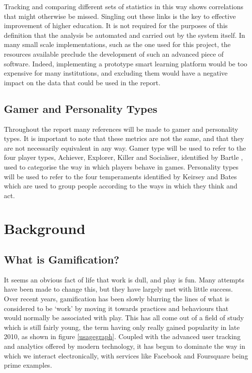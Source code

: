 \documentclass[12pt,a4paper,twoside]{report}
\begin{document}
Tracking and comparing different sets of statistics in this way shows correlations that might otherwise be missed. Singling out these links is the key to effective improvement of higher education. It is not required for the purposes of this definition that the analysis be automated and carried out by the system itself. In many small scale implementations, such as the one used for this project, the resources available preclude the development of such an advanced piece of software. Indeed, implementing a prototype smart learning platform would be too expensive for many institutions, and excluding them would have a negative impact on the data that could be used in the report.

\section{Gamer and Personality Types}
Throughout the report many references will be made to gamer and personality types. It is important to note that these metrics are not the same, and that they are not necessarily equivalent in any way. Gamer type will be used to refer to the four player types, Achiever, Explorer, Killer and Socialiser, identified by Bartle \cite{bartle1996hearts}, used to categorise the way in which players behave in games. Personality types will be used to refer to the four temperaments identified by Keirsey and Bates \cite{keirsey1998please} \cite{keirsey1984} which are used to group people according to the ways in which they think and act.

\chapter{Background}
\section{What is Gamification?}
It seems an obvious fact of life that work is dull, and play is fun. Many attempts have been made to change this, but they have largely met with little success. Over recent years, gamification has been slowly blurring the lines of what is considered to be `work' by moving it towards practices and behaviours that would normally be associated with play. This has all come out of a field of study which is still fairly young, the term having only really gained popularity in late 2010, as shown in figure \ref{usagegraph}. Coupled with the advanced user tracking and analytics offered by modern technology, it has begun to dominate the way in which we interact electronically, with services like Facebook and Foursquare being prime examples.
\end{document}
